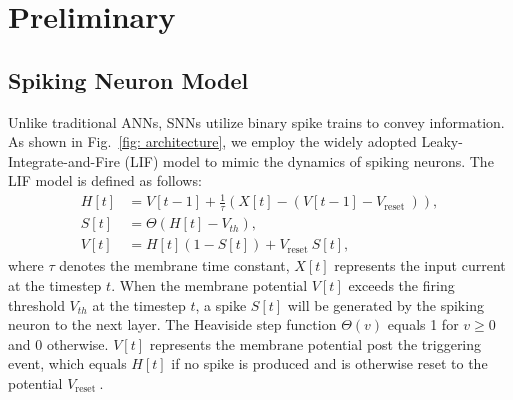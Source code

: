 \documentclass{article}
\theoremstyle{plain}
\theoremstyle{definition}
\theoremstyle{remark}
\begin{document}
\section{Preliminary}
\label{sec:pre}

\subsection{Spiking Neuron Model}
Unlike traditional ANNs, SNNs utilize binary spike trains to convey information. As shown in Fig.~\ref{fig: architecture}, we employ the widely adopted Leaky-Integrate-and-Fire (LIF) model to mimic the dynamics of spiking neurons. The LIF model is defined as follows:
\begin{align}
H[t] &= V[t-1]+\frac{1}{\tau}\left(X[t]-\left(V[t-1]-V_{\text {reset }}\right)\right), \\
S[t] &= \Theta\left(H[t]-V_{t h}\right), \\
V[t] &= H[t](1-S[t])+V_{\text {reset }} S[t],
\end{align}
where $\tau$ denotes the membrane time constant, $X[t]$ represents the input current at the timestep $t$. When the membrane potential $V[t]$ exceeds the firing threshold $V_{t h}$ at the timestep $t$, a spike $S[t]$ will be generated by the spiking neuron to the next layer. The Heaviside step function $\Theta(v)$ equals 1 for $v \geq 0$ and 0 otherwise. $V[t]$ represents the membrane potential post the triggering event, which equals $H[t]$ if no spike is produced and is otherwise reset to the potential $V_{\text {reset }}$.


 \vspace{-0.15em}
\end{document}
